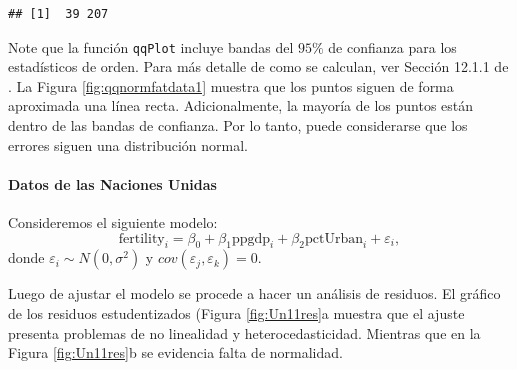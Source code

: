 \documentclass[
]{article}
\newenvironment{Shaded}{\begin{snugshade}}{\end{snugshade}}
\newcommand{\AttributeTok}[1]{\textcolor[rgb]{0.13,0.29,0.53}{#1}}
\newcommand{\DecValTok}[1]{\textcolor[rgb]{0.00,0.00,0.81}{#1}}
\newcommand{\FunctionTok}[1]{\textcolor[rgb]{0.13,0.29,0.53}{\textbf{#1}}}
\newcommand{\NormalTok}[1]{#1}
\newcommand{\OtherTok}[1]{\textcolor[rgb]{0.56,0.35,0.01}{#1}}
\newcommand{\SpecialCharTok}[1]{\textcolor[rgb]{0.81,0.36,0.00}{\textbf{#1}}}
\newcommand{\StringTok}[1]{\textcolor[rgb]{0.31,0.60,0.02}{#1}}
\begin{document}
\begin{verbatim}
## [1]  39 207
\end{verbatim}

Note que la función \texttt{qqPlot} incluye bandas del \(95\%\) de confianza para los estadísticos de orden. Para más detalle de como se calculan, ver Sección 12.1.1 de \citet{fox_applied_2016}. La Figura \ref{fig:qqnormfatdata1} muestra que los puntos siguen de forma aproximada una línea recta. Adicionalmente, la mayoría de los puntos están dentro de las bandas de confianza. Por lo tanto, puede considerarse que los errores siguen una distribución normal.

\paragraph*{Datos de las Naciones Unidas}\label{datos-de-las-naciones-unidas-1}

Consideremos el siguiente modelo:
\[
\mbox{fertility}_{i} = \beta_{0} + \beta_{1}\mbox{ppgdp}_{i} + \beta_{2}\mbox{pctUrban}_{i} + \varepsilon_{i},
\]
donde \(\varepsilon_{i}\sim N(0,\sigma^{2})\) y \(cov(\varepsilon_{j},\varepsilon_{k})=0\).

Luego de ajustar el modelo se procede a hacer un análisis de residuos. El gráfico de los residuos estudentizados (Figura \ref{fig:Un11res}a muestra que el ajuste presenta problemas de no linealidad y heterocedasticidad. Mientras que en la Figura \ref{fig:Un11res}b se evidencia falta de normalidad.

\begin{Shaded}
\end{Shaded}
\end{document}
